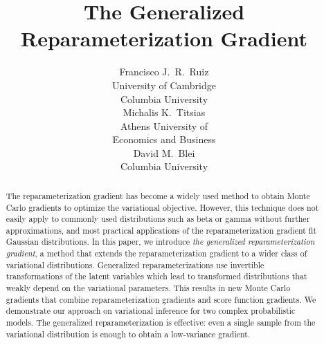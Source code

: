 \documentclass{article}
\title{The Generalized Reparameterization Gradient}
\author{
  Francisco J.~R.~Ruiz\\
  University of Cambridge\\
  Columbia University\\
  \And
  Michalis K.~Titsias\\
  Athens University of\\Economics and Business\\
  \And
  David M.~Blei\\
  Columbia University\\
}
\begin{document}
\maketitle


\vspace*{-14pt}
\begin{abstract} \vspace*{-5pt}
  The reparameterization gradient has become a widely used method to obtain Monte Carlo gradients to optimize the variational objective. However, this technique does not easily apply to commonly used distributions such as beta or gamma without further approximations, and most practical applications of the reparameterization gradient fit Gaussian distributions. In this paper, we introduce \emph{the generalized reparameterization gradient}, a method that extends the reparameterization gradient to a wider class of variational distributions. Generalized reparameterizations use invertible transformations of the latent variables which lead to transformed distributions that weakly depend on the variational parameters. This results in new Monte Carlo gradients that combine reparameterization gradients and score function gradients. We demonstrate our approach on variational inference for two complex probabilistic models. The generalized reparameterization is effective: even a single sample from the variational distribution is enough to obtain a low-variance gradient.
\end{abstract}

\end{document}
